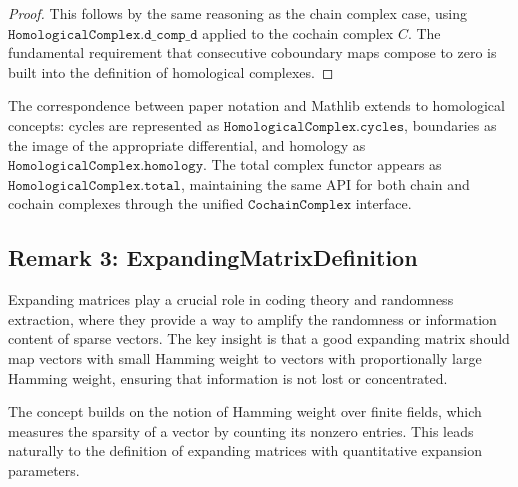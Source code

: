 \documentclass[11pt]{article}
\theoremstyle{plain}
\theoremstyle{definition}
\theoremstyle{remark}
\begin{document}
\begin{proof}
This follows by the same reasoning as the chain complex case, using $\texttt{HomologicalComplex.d\_comp\_d}$ applied to the cochain complex $C$. The fundamental requirement that consecutive coboundary maps compose to zero is built into the definition of homological complexes.
\end{proof}

The correspondence between paper notation and Mathlib extends to homological concepts: cycles are represented as $\texttt{HomologicalComplex.cycles}$, boundaries as the image of the appropriate differential, and homology as $\texttt{HomologicalComplex.homology}$. The total complex functor appears as $\texttt{HomologicalComplex.total}$, maintaining the same API for both chain and cochain complexes through the unified $\texttt{CochainComplex}$ interface.

\vspace{1em}

\subsection{Remark 3: ExpandingMatrixDefinition}

Expanding matrices play a crucial role in coding theory and randomness extraction, where they provide a way to amplify the randomness or information content of sparse vectors. The key insight is that a good expanding matrix should map vectors with small Hamming weight to vectors with proportionally large Hamming weight, ensuring that information is not lost or concentrated.

The concept builds on the notion of Hamming weight over finite fields, which measures the sparsity of a vector by counting its nonzero entries. This leads naturally to the definition of expanding matrices with quantitative expansion parameters.
\end{document}
